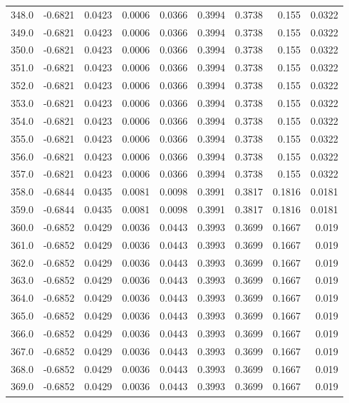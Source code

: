 \begin{longtable}{lrrrrrrrr}
348.0 & -0.6821 & 0.0423 & 0.0006 & 0.0366 & 0.3994 & 0.3738 & 0.155 & 0.0322 \\
349.0 & -0.6821 & 0.0423 & 0.0006 & 0.0366 & 0.3994 & 0.3738 & 0.155 & 0.0322 \\
350.0 & -0.6821 & 0.0423 & 0.0006 & 0.0366 & 0.3994 & 0.3738 & 0.155 & 0.0322 \\
351.0 & -0.6821 & 0.0423 & 0.0006 & 0.0366 & 0.3994 & 0.3738 & 0.155 & 0.0322 \\
352.0 & -0.6821 & 0.0423 & 0.0006 & 0.0366 & 0.3994 & 0.3738 & 0.155 & 0.0322 \\
353.0 & -0.6821 & 0.0423 & 0.0006 & 0.0366 & 0.3994 & 0.3738 & 0.155 & 0.0322 \\
354.0 & -0.6821 & 0.0423 & 0.0006 & 0.0366 & 0.3994 & 0.3738 & 0.155 & 0.0322 \\
355.0 & -0.6821 & 0.0423 & 0.0006 & 0.0366 & 0.3994 & 0.3738 & 0.155 & 0.0322 \\
356.0 & -0.6821 & 0.0423 & 0.0006 & 0.0366 & 0.3994 & 0.3738 & 0.155 & 0.0322 \\
357.0 & -0.6821 & 0.0423 & 0.0006 & 0.0366 & 0.3994 & 0.3738 & 0.155 & 0.0322 \\
358.0 & -0.6844 & 0.0435 & 0.0081 & 0.0098 & 0.3991 & 0.3817 & 0.1816 & 0.0181 \\
359.0 & -0.6844 & 0.0435 & 0.0081 & 0.0098 & 0.3991 & 0.3817 & 0.1816 & 0.0181 \\
360.0 & -0.6852 & 0.0429 & 0.0036 & 0.0443 & 0.3993 & 0.3699 & 0.1667 & 0.019 \\
361.0 & -0.6852 & 0.0429 & 0.0036 & 0.0443 & 0.3993 & 0.3699 & 0.1667 & 0.019 \\
362.0 & -0.6852 & 0.0429 & 0.0036 & 0.0443 & 0.3993 & 0.3699 & 0.1667 & 0.019 \\
363.0 & -0.6852 & 0.0429 & 0.0036 & 0.0443 & 0.3993 & 0.3699 & 0.1667 & 0.019 \\
364.0 & -0.6852 & 0.0429 & 0.0036 & 0.0443 & 0.3993 & 0.3699 & 0.1667 & 0.019 \\
365.0 & -0.6852 & 0.0429 & 0.0036 & 0.0443 & 0.3993 & 0.3699 & 0.1667 & 0.019 \\
366.0 & -0.6852 & 0.0429 & 0.0036 & 0.0443 & 0.3993 & 0.3699 & 0.1667 & 0.019 \\
367.0 & -0.6852 & 0.0429 & 0.0036 & 0.0443 & 0.3993 & 0.3699 & 0.1667 & 0.019 \\
368.0 & -0.6852 & 0.0429 & 0.0036 & 0.0443 & 0.3993 & 0.3699 & 0.1667 & 0.019 \\
369.0 & -0.6852 & 0.0429 & 0.0036 & 0.0443 & 0.3993 & 0.3699 & 0.1667 & 0.019 \\

\end{longtable}
